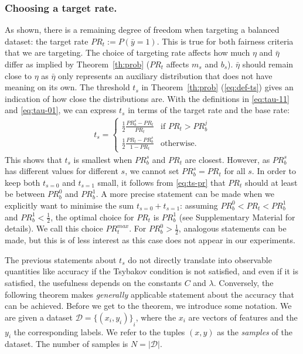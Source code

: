 \subsubsection{Choosing a target rate.}
\noindent As shown, there is a remaining degree of freedom when targeting a balanced dataset:
the target rate $\mathit{PR}_t := P(\bar{y}=1)$.
This is true for both fairness criteria that we are targeting.
The choice of targeting rate affects how much $\eta$ and $\bar{\eta}$ differ as implied by Theorem~\ref{th:prob}
($\mathit{PR}_t$ affects $m_s$ and $b_s$).
$\bar{\eta}$ should remain close to $\eta$
as $\bar{\eta}$ only represents an auxiliary distribution that does not have meaning on its own.
The threshold $t_s$ in Theorem~\ref{th:prob} (\eqref{eq:def-ts}) gives an indication of how close the distributions are.
With the definitions in \eqref{eq:tau-11} and \eqref{eq:tau-01},
we can express $t_s$ in terms of the target rate and the base rate:
\begin{align}
  t_s = \begin{cases}
    \frac{1}{2}\frac{\mathit{PR}_b^s - \mathit{PR}_t}{\mathit{PR}_t} &\text{if }\mathit{PR}_t>\mathit{PR}_b^j\\
    \frac{1}{2}\frac{\mathit{PR}_t - \mathit{PR}_b^s}{1 - \mathit{PR}_t} &\text{otherwise.}
  \end{cases}\label{eq:ts-pr}
\end{align}
This shows that $t_s$ is smallest when $\mathit{PR}_b^s$ and $\mathit{PR}_t$ are closest.
However, as $\mathit{PR}_b^s$ has different values for different $s$,
we cannot set $\mathit{PR}_b^s=\mathit{PR}_t$ for all $s$.
In order to keep both $t_{s=0}$ and $t_{s=1}$ small,
it follows from \eqref{eq:ts-pr} that $\mathit{PR}_t$ should at least be between $\mathit{PR}_b^0$ and $\mathit{PR}_b^1$.
A more precise statement can be made when we explicitly want to minimise the sum $t_{s=0} + t_{s=1}$:
assuming $\mathit{PR}_b^0<\mathit{PR}_t<\mathit{PR}_b^1$ and $\mathit{PR}_b^1<\tfrac{1}{2}$,
the optimal choice for $\mathit{PR}_t$ is $\mathit{PR}_b^1$ (see Supplementary Material for details).
We call this choice $\mathit{PR}_t^{max}$.
For $\mathit{PR}_b^0>\tfrac{1}{2}$, analogous statements can be made,
but this is of less interest as this case does not appear in our experiments.

The previous statements about $t_s$ do not directly translate into observable quantities like accuracy if the Tsybakov condition is not satisfied,
and even if it is satisfied, the usefulness depends on the constants $C$ and $\lambda$.
Conversely, the following theorem makes \emph{generally} applicable statement about the accuracy that can be achieved.
Before we get to the theorem, we introduce some notation.
We are given a dataset $\mathcal{D} = {\{(x_i, y_i)\}}_i$,
where the $x_i$ are vectors of features and the $y_i$ the corresponding labels.
We refer to the tuples $(x, y)$ as the \emph{samples} of the dataset.
The number of samples is $N = |\mathcal{D}|$.

